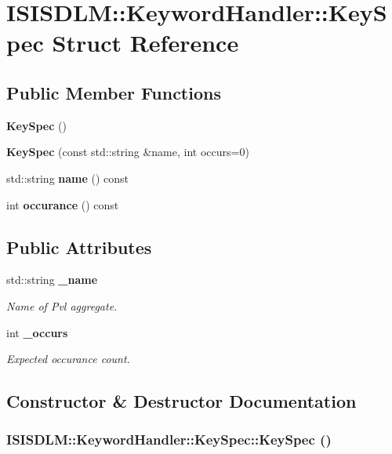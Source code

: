 \section{ISISDLM::Keyword\-Handler::Key\-Spec Struct Reference}
\label{structISISDLM_1_1KeywordHandler_1_1KeySpec}
\subsection*{Public Member Functions}
\begin{CompactItemize}
\item 
{\bf Key\-Spec} ()
\item 
{\bf Key\-Spec} (const std::string \&name, int occurs=0)
\item 
std::string {\bf name} () const
\item 
int {\bf occurance} () const
\end{CompactItemize}
\subsection*{Public Attributes}
\begin{CompactItemize}
\item 
std::string {\bf \_\-name}
\begin{CompactList}\small\item\em Name of Pvl aggregate. \item\end{CompactList}\item 
int {\bf \_\-occurs}
\begin{CompactList}\small\item\em Expected occurance count. \item\end{CompactList}\end{CompactItemize}


\subsection{Constructor \& Destructor Documentation}
\subsubsection{\setlength{\rightskip}{0pt plus 5cm}ISISDLM::Keyword\-Handler::Key\-Spec::Key\-Spec ()\hspace{0.3cm}{\tt  [inline]}}\label{structISISDLM_1_1KeywordHandler_1_1KeySpec_a0}


